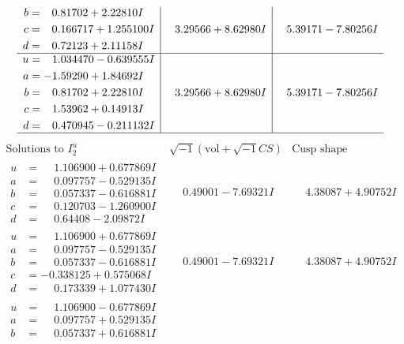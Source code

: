 \documentclass[1p]{elsarticle_modified}
\theoremstyle{definition}
\newcommand{\I}{\sqrt{-1}}
\begin{document}
$$\begin{array}{c|c|c}
\begin{aligned}
b &= \phantom{-}0.81702 + 2.22810 I \\
c &= \phantom{-}0.166717 + 1.255100 I \\
d &= \phantom{-}0.72123 + 2.11158 I\end{aligned}
 & \phantom{-}3.29566 + 8.62980 I & \phantom{-}5.39171 - 7.80256 I \\ \hline\begin{aligned}
u &= \phantom{-}1.034470 - 0.639555 I \\
a &= -1.59290 + 1.84692 I \\
b &= \phantom{-}0.81702 + 2.22810 I \\
c &= \phantom{-}1.53962 + 0.14913 I \\
d &= \phantom{-}0.470945 - 0.211132 I\end{aligned}
 & \phantom{-}3.29566 + 8.62980 I & \phantom{-}5.39171 - 7.80256 I\\
 \hline 
 \end{array}$$\newpage$$\begin{array}{c|c|c}  
\text{Solutions to }I^u_{2}& \I (\text{vol} + \sqrt{-1}CS) & \text{Cusp shape}\\
 \hline 
\begin{aligned}
u &= \phantom{-}1.106900 + 0.677869 I \\
a &= \phantom{-}0.097757 - 0.529135 I \\
b &= \phantom{-}0.057337 - 0.616881 I \\
c &= \phantom{-}0.120703 - 1.260900 I \\
d &= \phantom{-}0.64408 - 2.09872 I\end{aligned}
 & \phantom{-}0.49001 - 7.69321 I & \phantom{-}4.38087 + 4.90752 I \\ \hline\begin{aligned}
u &= \phantom{-}1.106900 + 0.677869 I \\
a &= \phantom{-}0.097757 - 0.529135 I \\
b &= \phantom{-}0.057337 - 0.616881 I \\
c &= -0.338125 + 0.575068 I \\
d &= \phantom{-}0.173339 + 1.077430 I\end{aligned}
 & \phantom{-}0.49001 - 7.69321 I & \phantom{-}4.38087 + 4.90752 I \\ \hline\begin{aligned}
u &= \phantom{-}1.106900 - 0.677869 I \\
a &= \phantom{-}0.097757 + 0.529135 I \\
b &= \phantom{-}0.057337 + 0.616881 I \\

\end{aligned}
\end{array}$$
\end{document}
